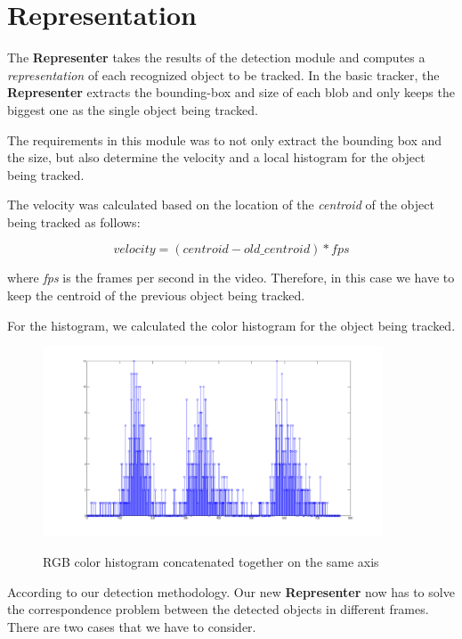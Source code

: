 \section{Representation}

The \textbf{Representer} takes the results of the detection module and computes a \textit{representation} of each recognized object to be tracked. In the basic tracker, the \textbf{Representer} extracts the bounding-box and size of each blob and only keeps the biggest one as the single object being tracked.

The requirements in this module was to not only extract the bounding box and the size, but also determine the velocity and a local histogram for the object being tracked.

The velocity was calculated based on the location of the \textit{centroid} of the object being tracked as follows:

\begin{equation}
velocity = (centroid - old\_centroid) * fps
\end{equation}

where \textit{fps} is the frames per second in the video. Therefore, in this case we have to keep the centroid of the previous object being tracked.

For the histogram, we calculated the color histogram for the object being tracked.

\begin{figure}[Color histogram]{\includegraphics[width=0.9\textwidth]{histogram_car}}
  \centering
  \caption{RGB color histogram concatenated together on the same axis}
\end{figure}

According to our detection methodology. Our new \textbf{Representer} now has to solve the correspondence problem between the detected objects in different frames. There are two cases that we have to consider.


